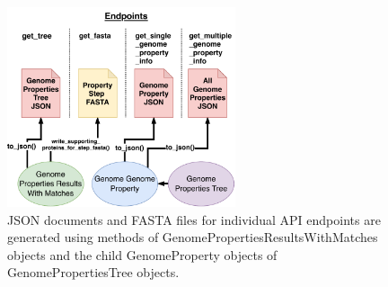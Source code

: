\begin{figure}[!ht]
  \centering
	\includegraphics[width=0.60\textwidth]{media/Micromeda-Endpoints.pdf}
	 \caption{JSON documents and FASTA files for individual API endpoints are generated using methods of GenomePropertiesResultsWithMatches objects and the child GenomeProperty objects of GenomePropertiesTree objects.}
	 \label{fig:micromeda-endpoints}
\end{figure}

